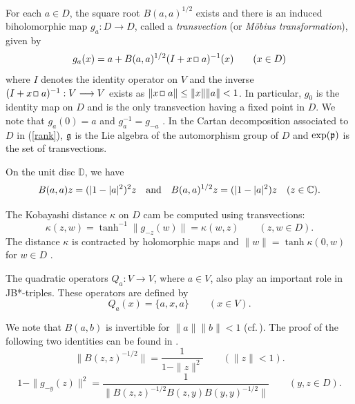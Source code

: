 \documentclass[12pt, twoside]{article}
\def\sqr#1#2{{\,\vcenter{\vbox{\hrule height.#2pt\hbox{\vrule width.#2pt
height#1pt \kern#1pt\vrule width.#2pt}\hrule height.#2pt}}\,}}
\def\bo{\sqr44\,}
\theoremstyle{definition}
\numberwithin{equation}{section}
\begin{document}
For each $a\in D$, the square root $B(a,a)^{1/2}$ exists and there is an induced
 biholomorphic map $g_a : D \longrightarrow D$,
 called a {\it transvection} (or {\it M\"obius transformation}),
 given by
\begin{equation}\label{g2}
g_a(x) = a + B(a,a)^{1/2}(I+x\bo a)^{-1}(x) \qquad (x\in D)
\end{equation}
where $I$ denotes the identity operator on $V$ and the inverse
$(I+x\bo a)^{-1}: V \longrightarrow V$ exists as $\|x\bo a\|\leq \|x\|\|a\| <1$.
In particular, $g_0$ is the identity map on $D$ and is the only transvection
having a fixed point in $D$. We note that
$g_a(0)=a$ and $g_a^{-1} = g_{-a}$ \cite[Lemma 3.2.25]{book2}.
In the Cartan decomposition associated to $D$ in (\ref{rank}), $\frak g$ is the Lie
algebra of the automorphism group of $D$ and
$\exp (\frak p)$ is the set of transvections.

On the unit disc $\mathbb{D}$, we have
\begin{equation}\label{bz}
B(a,a)z=( |1-|a|^2)^2 z \quad {\rm and} \quad B(a,a)^{1/2}z=( |1-|a|^2) z \quad (z\in \mathbb{C}).
\end{equation}

 The Kobayashi distance $\kappa$ on $D$ cam be computed using transvections:
\begin{equation}\label{alphapho}
\kappa(z,  w)= \tanh^{-1}\|g_{-z}(w)\| = \kappa(w,z) \qquad ( z, w\in D).
\end{equation} The distance $\kappa$ is contracted by holomorphic maps and
$\|w\|= \tanh \kappa(0,w) $ for $w\in D$ \cite[Theorem 3.5.9]{book2}.


The quadratic operators $Q_a : V \longrightarrow V$, where $a\in V$, also play an important role in
JB*-triples. These operators are defined by
$$Q_a(x) = \{a,x,a\} \qquad (x\in V).$$

We note that $B(a,b)$ is invertible for $\|a\|\|b\|<1$ (cf.\,\cite[(7.3) vii]{LOOS}).
 The proof of the following two identities
 can be found in \cite[Proposition 3.2.13. Lemma 3.2.17]{book}.
\begin{equation}\label{bid2}
\|B(z,z)^{-1/2}\| = \frac{1}{1-\|z\|^2} \qquad (\|z\|<1).
\end{equation}
\begin{equation}\label{bid}
1- \|g_{-y}(z)\|^2 = \frac{1}{\|B(z,z)^{-1/2}B(z, y)B(y, y)^{-1/2}\|}
\qquad (y, z\in D).                                                                                                                                                                      
\end{equation}
\end{document}

